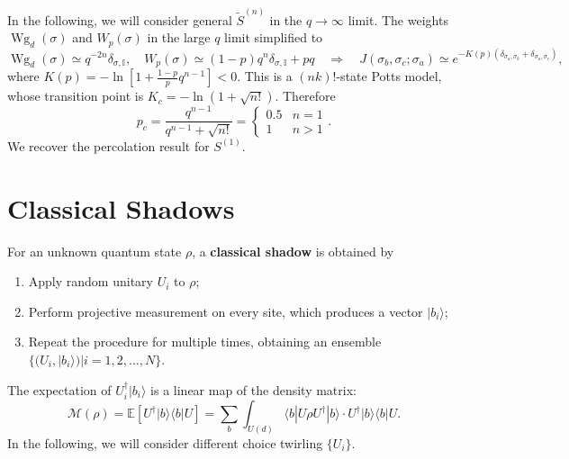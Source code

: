 \documentclass{SciPost}
\begin{document}
In the following, we will consider general $\tilde S^{(n)}$ in the $q\rightarrow \infty$ limit.
The weights $\operatorname{Wg}_{d}(\sigma)$ and $W_p(\sigma)$ in the large $q$ limit simplified to 
\begin{equation}
	\operatorname{Wg}_d(\sigma) \simeq q^{-2n} \delta_{\sigma,\mathbb I},\quad
	W_p(\sigma) \simeq (1-p)q^{n}\delta_{\sigma,\mathbb I}+pq
	\quad\Longrightarrow\quad
	J(\sigma_b,\sigma_c;\sigma_a) \simeq e^{-K(p)(\delta_{\sigma_a,\sigma_b}+\delta_{\sigma_a,\sigma_c})},
\end{equation}
where $K(p) = -\ln\left[1+\frac{1-p}{p}q^{n-1}\right] < 0$.
This is a $(nk)!$-state Potts model, whose transition point is $K_c = -\ln(1+\sqrt{n!})$.
Therefore
\begin{equation}
	p_c = \frac{q^{n-1}}{q^{n-1}+\sqrt{n!}} = \begin{cases}
		0.5 & n=1 \\
		1 & n >1 
	\end{cases}.
\end{equation}
We recover the percolation result for $S^{(1)}$.




\section{Classical Shadows}

For an unknown quantum state $\rho$, a \textbf{classical shadow} is obtained by
\begin{enumerate}
	\item Apply random unitary $U_i$ to $\rho$;
	\item Perform projective measurement on every site, which produces a vector $|b_i\rangle$;
	\item Repeat the procedure for multiple times, obtaining an ensemble $\{(U_i,|b_i\rangle)|i=1,2,\dots,N\}$.
\end{enumerate}
The expectation of $U_i^\dagger|b_i\rangle$ is a linear map of the density matrix:
\begin{equation}
	\mathcal M(\rho) 
	= \mathbb{E}\left[U^\dagger |b\rangle\langle b|U\right]
	= \sum_b \int_{U(d)} \langle b|U\rho U^\dagger|b\rangle \cdot U^\dagger |b\rangle\langle b|U.
\end{equation}
In the following, we will consider different choice twirling $\{U_i\}$.
\end{document}
